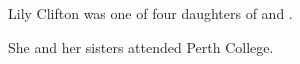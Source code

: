 
Lily Clifton was one of four daughters of  and .

She and her sisters attended Perth College.\cite{WestAusSocialNotes1913}
